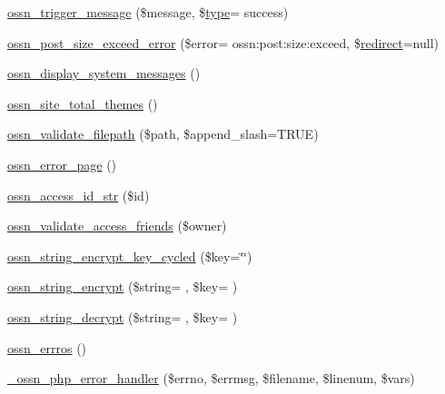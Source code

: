 \begin{DoxyCompactItemize}
\item 
\hyperlink{ossn_8lib_8system_8php_ab3f23f23f32f50c12e7aea0ffaccaac7}{ossn\+\_\+trigger\+\_\+message} (\$message, \$\hyperlink{_ossn_wall_2actions_2wall_2post_2group_8php_a2dc1bb4e1ed0029daa81ac0776b14b51}{type}= \textquotesingle{}success\textquotesingle{})
\item 
\hyperlink{ossn_8lib_8system_8php_a8b0d58360968f1c094b12c9990144f6d}{ossn\+\_\+post\+\_\+size\+\_\+exceed\+\_\+error} (\$error= \textquotesingle{}ossn\+:post\+:size\+:exceed\textquotesingle{}, \$\hyperlink{ossn_8lib_8system_8php_a33cafdb93398ec540993c12c1daa0c48}{redirect}=null)
\item 
\hyperlink{ossn_8lib_8system_8php_af96ae2d8d86879338937c673556dd14a}{ossn\+\_\+display\+\_\+system\+\_\+messages} ()
\item 
\hyperlink{ossn_8lib_8system_8php_ad21011ff294dd417aadf23a7e3e53f79}{ossn\+\_\+site\+\_\+total\+\_\+themes} ()
\item 
\hyperlink{ossn_8lib_8system_8php_aea8c1f23d5f8b3c27c0b897338a7dcec}{ossn\+\_\+validate\+\_\+filepath} (\$path, \$append\+\_\+slash=T\+R\+UE)
\item 
\hyperlink{ossn_8lib_8system_8php_a68357e4dfe884fa0b75c7bb8a8c5e63d}{ossn\+\_\+error\+\_\+page} ()
\item 
\hyperlink{ossn_8lib_8system_8php_a9786a0bbec8dfa87a1233e5212e53c07}{ossn\+\_\+access\+\_\+id\+\_\+str} (\$id)
\item 
\hyperlink{ossn_8lib_8system_8php_a9182534960ec21aacb0aa77f96a1b139}{ossn\+\_\+validate\+\_\+access\+\_\+friends} (\$owner)
\item 
\hyperlink{ossn_8lib_8system_8php_aa68963dd5ec4dc19d96f260789109e6c}{ossn\+\_\+string\+\_\+encrypt\+\_\+key\+\_\+cycled} (\$key=\char`\"{}\char`\"{})
\item 
\hyperlink{ossn_8lib_8system_8php_ad431a0de00fe863fe01c75306f5f578b}{ossn\+\_\+string\+\_\+encrypt} (\$string= \textquotesingle{}\textquotesingle{}, \$key= \textquotesingle{}\textquotesingle{})
\item 
\hyperlink{ossn_8lib_8system_8php_aebcea3e1525e08f3381e9ee153b18a89}{ossn\+\_\+string\+\_\+decrypt} (\$string= \textquotesingle{}\textquotesingle{}, \$key= \textquotesingle{}\textquotesingle{})
\item 
\hyperlink{ossn_8lib_8system_8php_a469f214f5eb1dfb016dd14371b90f29a}{ossn\+\_\+errros} ()
\item 
\hyperlink{ossn_8lib_8system_8php_a30e3795e8508081ca6d26460a745326f}{\+\_\+ossn\+\_\+php\+\_\+error\+\_\+handler} (\$errno, \$errmsg, \$filename, \$linenum, \$vars)

\end{DoxyCompactItemize}
